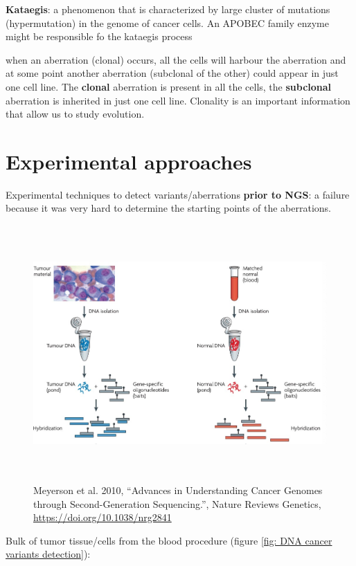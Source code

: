 \textbf{Kataegis}: a phenomenon that is characterized by large cluster of
mutations (hypermutation) in the genome of cancer cells. An APOBEC family enzyme
might be responsible fo the kataegis process


when an aberration (clonal) occurs, all the cells will harbour the aberration
and at some point another aberration (subclonal of the other) could appear in
just one cell line. The \textbf{clonal} aberration is present in all the cells,
the \textbf{subclonal} aberration is inherited in just one cell line. Clonality
is an important information that allow us to study evolution.


\hypertarget{experimental-approaches}{%
\section{Experimental approaches}\label{experimental-approaches}}


Experimental techniques to detect variants/aberrations \textbf{prior to NGS}: a
failure because it was very hard to determine the starting points of the
aberrations. %

\begin{figure}[H]
  \includegraphics[width=6.18343in,height=3.84729in]{image9.jpeg}
  \centering
  \caption{Meyerson et al. 2010, ``Advances in Understanding Cancer Genomes
  through Second-Generation Sequencing.'', Nature Reviews Genetics,
  \url{https://doi.org/10.1038/nrg2841}}
\end{figure}

Bulk of tumor tissue/cells from the blood procedure (figure \ref{fig: DNA cancer
variants detection}):


